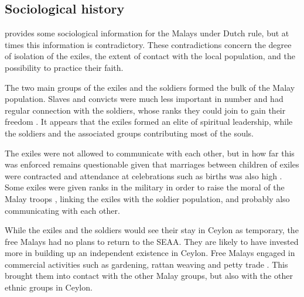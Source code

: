 \subsection{Sociological history}\label{sec:slmbg:SociologicalhistoryunderDutchrule}

\citet{Hussainmiya1987,Hussainmiya1990} provides some sociological information for the Malays under Dutch rule, but at times this information is contradictory. These contradictions concern the degree of isolation of the exiles, the extent of contact with the local population, and the possibility to practice their faith.

The two main groups of the exiles and the soldiers formed the bulk of the Malay population. Slaves and convicts were much less important in number and had regular connection with the soldiers, whose ranks they could join to gain their freedom \citep[48]{Hussainmiya1990}. It appears that the exiles formed  an elite of spiritual leadership, while the soldiers and the associated groups contributing  most of the souls.

The exiles were not allowed to communicate with each  other, but in how far this was enforced remains questionable given that marriages between children of exiles were contracted and attendance at celebrations such as births was also high \citep[43f]{Hussainmiya1990}. Some exiles were given ranks in the military in order to raise the moral of the Malay troops \citep[50]{Hussainmiya1990}, linking the exiles with the soldier population, and probably also communicating with each other.


While the exiles and the soldiers would see their stay in Ceylon as temporary, the free Malays had no plans to return to the SEAA. They are likely to have invested more in building up an independent existence in Ceylon.  Free Malays engaged in commercial activities such as gardening, rattan weaving and petty trade \citep[53]{Hussainmiya1987}. This  brought them into contact with the other Malay groups, but also with the other ethnic groups in Ceylon.
 
